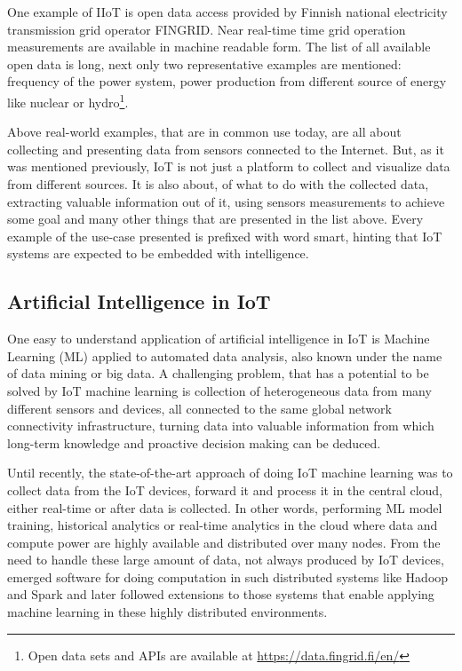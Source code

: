 \documentclass[english, 12pt, a4paper, elec, utf8, online]{aaltothesis}
\begin{document}
One example of IIoT is open data access provided by Finnish national electricity transmission grid operator FINGRID. Near real-time time grid operation measurements are available in machine readable form. The list of all available open data is long, next only two representative examples are mentioned: frequency of the power system, power production from different source of energy like nuclear or hydro\footnote{Open data sets and APIs are available at \url{https://data.fingrid.fi/en/}}.  

Above real-world examples, that are in common use today, are all about collecting and presenting data from sensors connected to the Internet. But, as it was mentioned previously, IoT is not just a platform to collect and visualize data from different sources. It is also about, of what to do with the collected data, extracting valuable information out of it, using sensors measurements to achieve some goal and many other things that are presented in the list above. Every example of the use-case presented is prefixed with word smart, hinting that IoT systems are expected to be embedded with intelligence. 


\subsection{Artificial Intelligence in IoT}
One easy to understand application of artificial intelligence in IoT is Machine Learning (ML) applied to automated data analysis, also known under the name of data mining or big data. A challenging problem, that has a potential to be solved by IoT machine learning is collection of heterogeneous data from many different sensors and devices, all connected to the same global network connectivity infrastructure, turning data into valuable information from which long-term knowledge and proactive decision making can be deduced. 


Until recently, the state-of-the-art approach of doing IoT machine learning was to collect data from the IoT devices, forward it and process it in the central cloud, either real-time or after data is collected. In other words, performing ML model training, historical analytics or real-time analytics in the cloud where data and compute power are highly available and distributed over many nodes. From the need to handle these large amount of data, not always produced by IoT devices, emerged software for doing computation in such distributed systems like Hadoop and Spark and later
followed extensions to those systems that enable applying machine learning in these highly distributed environments. 
\end{document}
